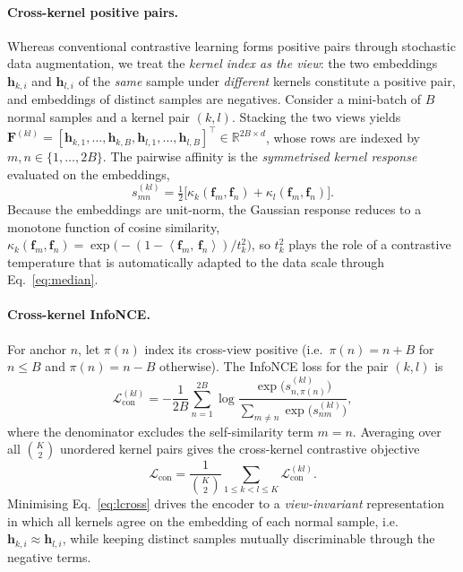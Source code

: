 \documentclass[preprint,12pt]{elsarticle}
\newcommand{\R}{\mathbb{R}}
\newcommand{\inner}[2]{\left\langle #1,\, #2 \right\rangle}
\newcommand{\Lcross}{\mathcal{L}_{\mathrm{con}}}
\newcommand{\hh}{\bm{h}}
\begin{document}
\paragraph{Cross-kernel positive pairs.}
Whereas conventional contrastive learning forms positive pairs through
stochastic data augmentation, we treat the \emph{kernel index as the view}: the
two embeddings $\hh_{k,i}$ and $\hh_{l,i}$ of the \emph{same} sample under
\emph{different} kernels constitute a positive pair, and embeddings of distinct
samples are negatives. Consider a mini-batch of $B$ normal samples and a kernel
pair $(k,l)$. Stacking the two views yields
$\bm{F}^{(kl)}=[\hh_{k,1},\dots,\hh_{k,B},\hh_{l,1},\dots,\hh_{l,B}]^{\!\top}
\in\R^{2B\times d}$,
whose rows are indexed by $m,n\in\{1,\dots,2B\}$. The pairwise affinity is the
\emph{symmetrised kernel response} evaluated on the embeddings,
\begin{equation}
s^{(kl)}_{mn}
=\tfrac{1}{2}\big[\kappa_k(\bm{f}_m,\bm{f}_n)
+\kappa_l(\bm{f}_m,\bm{f}_n)\big].
\label{eq:affinity}
\end{equation}
Because the embeddings are unit-norm, the Gaussian response reduces to a
monotone function of cosine similarity,
$\kappa_k(\bm{f}_m,\bm{f}_n)
=\exp\!\big(-(1-\inner{\bm{f}_m}{\bm{f}_n})/t_k^{2}\big)$,
so $t_k^{2}$ plays the role of a contrastive temperature that is automatically
adapted to the data scale through Eq.~\eqref{eq:median}.

\paragraph{Cross-kernel InfoNCE.}
For anchor $n$, let $\pi(n)$ index its cross-view positive (i.e.\ $\pi(n)=n+B$
for $n\le B$ and $\pi(n)=n-B$ otherwise). The InfoNCE loss for the pair $(k,l)$
is
\begin{equation}
\Lcross^{(kl)}
=-\frac{1}{2B}\sum_{n=1}^{2B}
\log\frac{\exp\!\big(s^{(kl)}_{n,\pi(n)}\big)}
{\displaystyle\sum_{m\neq n}\exp\!\big(s^{(kl)}_{nm}\big)},
\label{eq:infonce}
\end{equation}
where the denominator excludes the self-similarity term $m=n$. Averaging over
all $\binom{K}{2}$ unordered kernel pairs gives the cross-kernel contrastive
objective
\begin{equation}
\Lcross
=\frac{1}{\binom{K}{2}}
\sum_{1\le k<l\le K}\Lcross^{(kl)}.
\label{eq:lcross}
\end{equation}
Minimising Eq.~\eqref{eq:lcross} drives the encoder to a \emph{view-invariant}
representation in which all kernels agree on the embedding of each normal
sample, i.e.\ $\hh_{k,i}\!\approx\!\hh_{l,i}$, while keeping distinct samples
mutually discriminable through the negative terms.
\end{document}
